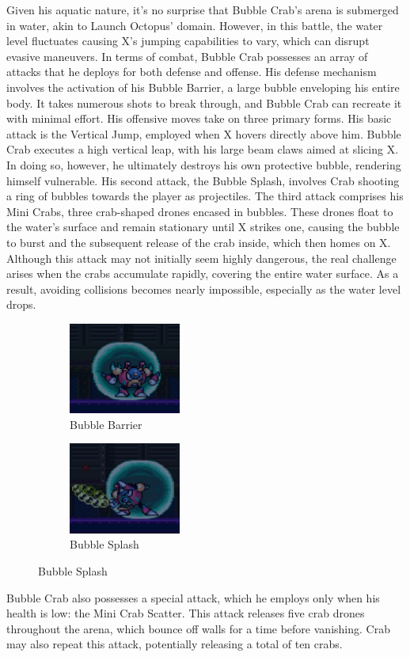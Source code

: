 Given his aquatic nature, it's no surprise that Bubble Crab's arena is submerged in water, akin to Launch Octopus' domain. However, in this battle, the water level fluctuates causing X's jumping capabilities to vary, which can disrupt evasive maneuvers. In terms of combat, Bubble Crab possesses an array of attacks that he deploys for both defense and offense. His defense mechanism involves the activation of his Bubble Barrier, a large bubble enveloping his entire body. It takes numerous shots to break through, and Bubble Crab can recreate it with minimal effort. His offensive moves take on three primary forms. His basic attack is the Vertical Jump, employed when X hovers directly above him. Bubble Crab executes a high vertical leap, with his large beam claws aimed at slicing X. In doing so, however, he ultimately destroys his own protective bubble, rendering himself vulnerable. His second attack, the Bubble Splash, involves Crab shooting a ring of bubbles towards the player as projectiles. The third attack comprises his Mini Crabs, three crab-shaped drones encased in bubbles. These drones float to the water's surface and remain stationary until X strikes one, causing the bubble to burst and the subsequent  release of the crab inside, which then homes on X. Although this attack may not initially seem highly dangerous, the real challenge arises when the crabs accumulate rapidly, covering the entire water surface. As a result, avoiding collisions becomes nearly impossible, especially as the water level drops.
\begin{figure}[htp]
	\centering
	\begin{subfigure}{0.3\linewidth}
		\centering
		\includegraphics[height=3cm]{figures/X2/Bubble_crab/Crab_bubble.png}
		\caption{Bubble Barrier}
	\end{subfigure}
	\begin{subfigure}{0.3\linewidth}
		\centering
		\includegraphics[height=3cm]{figures/X2/Bubble_crab/Crab_splasher.png}
		\caption{Bubble Splash}
	\end{subfigure}
\end{figure}
Bubble Crab also possesses a special attack, which he employs only when his health is low: the Mini Crab Scatter. This attack releases five crab drones throughout the arena, which bounce off walls for a time before vanishing. Crab may also repeat this attack, potentially releasing a total of ten crabs. 

